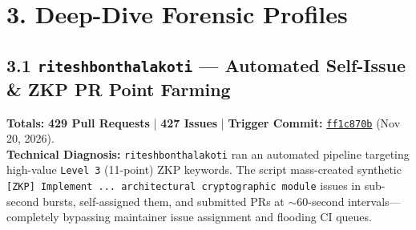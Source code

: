 \documentclass[11pt,a4paper]{article}
\begin{document}
\section{3. Deep-Dive Forensic Profiles}

\subsection{3.1 \texttt{riteshbonthalakoti} — Automated Self-Issue \& ZKP PR Point Farming}
\textbf{Totals:} \textbf{429 Pull Requests} | \textbf{427 Issues} | \textbf{Trigger Commit:} \href{https://github.com/SatyamPandey-07/WorkSphere/commit/ff1c870b86fd0c1886e3c7a66f1096ae4397f4dd}{\texttt{ff1c870b}} (Nov 20, 2026).\\
\textbf{Technical Diagnosis:} \texttt{riteshbonthalakoti} ran an automated pipeline targeting high-value \texttt{Level 3} (11-point) ZKP keywords. The script mass-created synthetic \texttt{[ZKP] Implement ... architectural cryptographic module} issues in sub-second bursts, self-assigned them, and submitted PRs at $\sim$60-second intervals—completely bypassing maintainer issue assignment and flooding CI queues.
\end{document}
